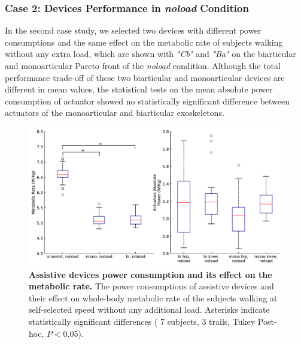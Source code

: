 \documentclass[10pt,letterpaper]{article}
\begin{document}
\subsubsection*{Case 2: Devices Performance in \textit{\textit{noload}} Condition}
In the second case study, we selected two devices with different power consumptions and the same effect on the metabolic rate of subjects walking without any extra load, which are shown with {\it "Cb" } and {\it "Ba" } on the biarticular and monoarticular Pareto front of the {\it noload} condition. Although the total performance trade-off of these two biarticular and monoarticular devices are different in mean values, the statistical tests on the mean absolute power consumption of actuator showed no statistically significant difference between actuators of the monoarticular and biarticular exoskeletons.
\begin{figure}[ht]   
	\centering
	\includegraphics[width=\linewidth]{Case_Studies/NoloadMono06_NoloadBi12/PaperFigure_BoxPlot.pdf}
	\vspace{1mm}
	\caption{\small{\textbf{Assistive devices power consumption and its effect on the metabolic rate.} The power consumptions of assistive devices and their effect on whole-body metabolic rate of the subjects walking at self-selected speed without any additional load. Asterisks indicate statistically significant differences ( 7 subjects, 3 trails, Tukey Post-hoc, $P < 0.05$).}}
	\label{Fig_Case02_Energy_Plot}
\end{figure}
\end{document}
